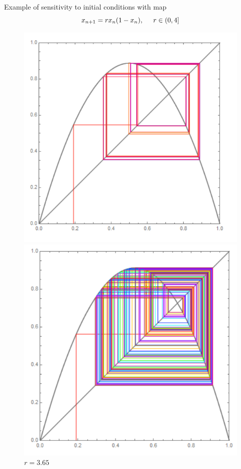 
Example of sensitivity to initial conditions with map
\begin{equation*}
    x_{n+1} = r x_n (1 - x_n), \hspace{5 mm} r \in (0, 4]
\end{equation*}

\begin{figure}[h]

\begin{minipage}{0.48\textwidth}
    \includegraphics[width=1\textwidth]{images/355.png}
    \caption{$r = 3.55$}
\end{minipage}
\hfill
\begin{minipage}{0.48\textwidth}
    \includegraphics[width=1\textwidth]{images/365.png}
    \caption{$r = 3.65$}
\end{minipage}

\end{figure}

